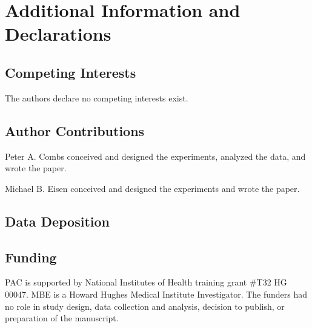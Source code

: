 \section{Additional Information and Declarations}
\subsection{Competing Interests}
The authors declare no competing interests exist.


\subsection{Author Contributions}
Peter A. Combs conceived and designed the experiments, analyzed the data, and wrote the paper.


Michael B. Eisen conceived and designed the experiments and wrote the paper.


\subsection{Data Deposition}


\subsection{Funding}
PAC is supported by National Institutes of Health training grant \#T32 HG 00047. MBE is a Howard Hughes Medical Institute Investigator. The funders had no role in study design, data collection and analysis, decision to publish, or preparation of the manuscript.
